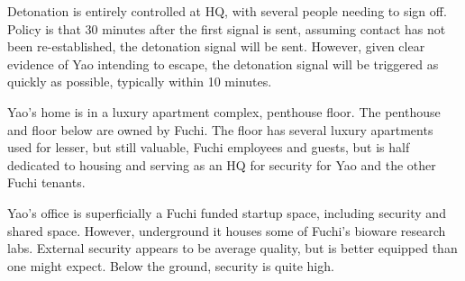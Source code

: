\begin{scenario}[CC-BY-SA-4.0]
Detonation is entirely controlled at HQ, with several people needing to sign off. Policy is that 30 minutes after the first signal is sent, assuming contact has not been re-established, the detonation signal will be sent.  However, given clear evidence of Yao intending to escape, the detonation signal will be triggered as quickly as possible, typically within 10 minutes.

Yao's home is in a luxury apartment complex, penthouse floor.  The penthouse and floor below are owned by Fuchi. The floor has several luxury apartments used for lesser, but still valuable, Fuchi employees and guests, but is half dedicated to housing and serving as an HQ for security for Yao and the other Fuchi tenants.

Yao's office is superficially a Fuchi funded startup space, including security and shared space.  However, underground it houses some of Fuchi's bioware research labs.  External security appears to be average quality, but is better equipped than one might expect. Below the ground, security is quite high.

\end{scenario}
